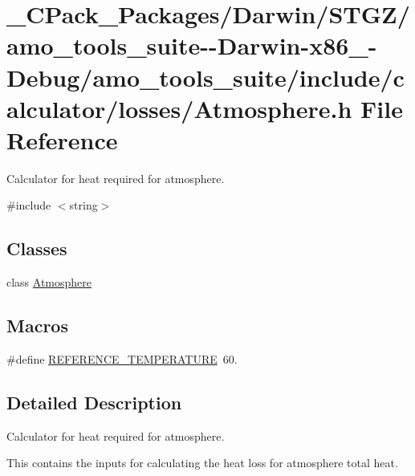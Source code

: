 \hypertarget{___c_pack___packages_2_darwin_2_s_t_g_z_2amo__tools__suite--_darwin-x86__64-_debug_2amo__tools__7727b2302b92ae6542446d85da658463}{}\section{\+\_\+\+C\+Pack\+\_\+\+Packages/\+Darwin/\+S\+T\+G\+Z/amo\+\_\+tools\+\_\+suite-\/-\/\+Darwin-\/x86\+\_-\/\+Debug/amo\+\_\+tools\+\_\+suite/include/calculator/losses/\+Atmosphere.h File Reference}
\label{___c_pack___packages_2_darwin_2_s_t_g_z_2amo__tools__suite--_darwin-x86__64-_debug_2amo__tools__7727b2302b92ae6542446d85da658463}


Calculator for heat required for atmosphere.  


{\ttfamily \#include $<$string$>$}\newline
\subsection*{Classes}
\begin{DoxyCompactItemize}
\item 
class \hyperlink{class_atmosphere}{Atmosphere}
\end{DoxyCompactItemize}
\subsection*{Macros}
\begin{DoxyCompactItemize}
\item 
\#define \hyperlink{___c_pack___packages_2_darwin_2_s_t_g_z_2amo__tools__suite--_darwin-x86__64-_debug_2amo__tools__7727b2302b92ae6542446d85da658463_a4fb3326b931fe94b2ec5f8acfbdd56a8}{R\+E\+F\+E\+R\+E\+N\+C\+E\+\_\+\+T\+E\+M\+P\+E\+R\+A\+T\+U\+RE}~60.
\end{DoxyCompactItemize}


\subsection{Detailed Description}
Calculator for heat required for atmosphere. 

This contains the inputs for calculating the heat loss for atmosphere total heat.

